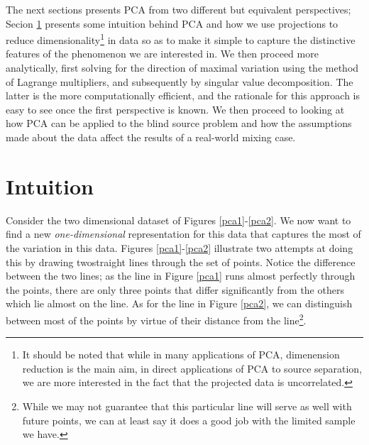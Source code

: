 \documentclass[11pt, oneside, a4paper]{report}
\begin{document}
The next sections presents PCA from two different but equivalent
perspectives; Secion \ref{pca_intuition} presents some intuition
behind PCA and how we use projections to reduce
dimensionality\footnote{It should be noted that while in many
  applications of PCA, dimenension reduction is the main aim, in
  direct applications of  PCA to source separation, we are more
  interested in the fact that the projected data is uncorrelated.} in data
so as to make it simple to capture the distinctive features of the
phenomenon we are interested in. We then proceed more
analytically, first solving for the direction of maximal variation
using the method of Lagrange multipliers, and subsequently by singular
value decomposition. The latter is the more computationally
efficient, and the rationale for this approach is easy to see once the
first perspective is known. We then proceed to looking at how PCA can
be applied to the blind source problem and how the assumptions made
about the data affect the results of a real-world mixing case.


\section{Intuition}\label{pca_intuition}

Consider the two dimensional dataset of Figures
\ref{pca1}-\ref{pca2}. We now want to find a new
\emph{one-dimensional} representation for
this data that captures the most of the variation in this data. Figures
\ref{pca1}-\ref{pca2} illustrate two attempts at doing this by drawing
twostraight lines through the set of points. Notice the difference
between the two lines; as the line in Figure \ref{pca1} runs
almost perfectly through the points, there are only three points that
differ significantly from the others which lie almost on the line. As for
the line in Figure \ref{pca2}, we can distinguish between most of the
points by virtue of their distance from the line\footnote{ While we may not
guarantee that this particular line will serve as well with future
points, we can at least say it does a good job with the limited sample
we have.}.
\end{document}
